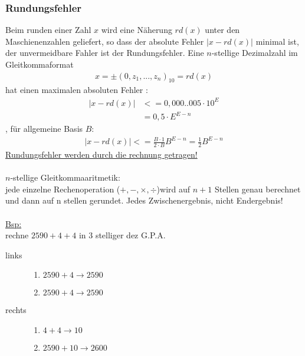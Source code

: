 \subsubsection{Rundungsfehler}
Beim runden einer Zahl $x$ wird eine Näherung $rd(x)$ unter den Maschienenzahlen geliefert,  so dass der absolute Fehler $\left|x-rd(x)\right|$ minimal ist, der unvermeidbare Fahler ist der Rundungsfehler. Eine $n$-stellige Dezimalzahl im Gleitkommaformat
\begin{align}
  x = \pm (0,z_1,...,z_n)_{10}=rd(x)
\end{align}
hat einen maximalen absoluten Fehler : 
\begin{align}
  \left| x - rd(x)\right| &<= 0,000..005 \cdot 10^E \\
  &= 0,5 \cdot E^{E-n}
\end{align}
, für allgemeine Basis $B$:
\begin{align}
  \left|x-rd(x)\right| <= \frac{B \cdot 1}{2 \cdot B} B^{E-n} = \frac{1}{2} B^{E-n}
\end{align}
\underline{Rundungsfehler werden durch die rechnung getragen!} \\ \\
$n$-stellige Gleitkommaaritmetik: \\
jede einzelne Rechenoperation ($+,-,\times,\div$)wird auf $n+1$ Stellen genau berechnet und dann auf n stellen gerundet. Jedes Zwischenergebnis, nicht Endergebnis! \\ \\
\underline{Bsp:} \\ 
rechne $2590 + 4 + 4 $ in 3 stelliger dez G.P.A.
\begin{description}
\item [links]
\begin{enumerate}
\item $2590 + 4 \rightarrow 2590$
\item $2590 + 4 \rightarrow 2590$
\end{enumerate}
\item [rechts]
\begin{enumerate}
\item $4 + 4 \rightarrow 10$
\item $2590 + 10 \rightarrow 2600$
\end{enumerate}
\end{description}

